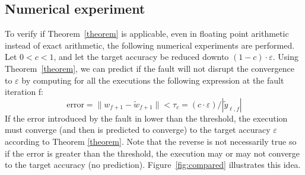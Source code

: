 \documentclass[twoside]{article}
\newcounter{fig}\setcounter{fig}{0}
\begin{document}
  \subsection{Numerical experiment}
  To verify if Theorem~\ref{theorem} is applicable, even in floating point arithmetic instead of exact arithmetic, the following numerical experiments are performed.
    Let $0 < c < 1$, and let the target accuracy be reduced downto $(1 - c) \cdot \varepsilon$. Using Theorem~\ref{theorem}, we can predict if the fault will not disrupt the convergence to $\varepsilon$ by computing for all the executions the following expression at the fault iteration f:
  \begin{equation}
    \text{error} = \|{w}_{f+1} - \widetilde{w}_{f+1}\| < \tau_c = (c \cdot \varepsilon) / |\widetilde{y}_{\ell, f}|
  \end{equation}\label{scheme_oracle}
  If the error introduced by the fault in lower than the threshold, the execution must converge (and then is predicted to converge) to the target accuracy $\varepsilon$ according to Theorem \ref{theorem}. Note that the reverse is not necessarily true so if the error is greater than the threshold, the execution may or may not converge to the target accuracy (no prediction). Figure~\ref{fig:compared} illustrates this idea.
\end{document}
